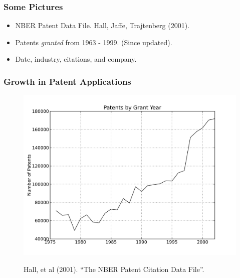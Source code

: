 \documentclass{beamer}
\begin{document}

\begin{frame}[t]\frametitle{Some Pictures}
    
\begin{itemize}
  \item NBER Patent Data File. Hall, Jaffe, Trajtenberg (2001).
  \item Patents \emph{granted} from 1963 - 1999. (Since updated).
  \item Date, industry, citations, and company.
\end{itemize}

\end{frame}

\begin{frame}[t]\frametitle{Growth in Patent Applications} 
\fontsize{6pt}{7.2}\selectfont
\!\!\!\!\!\!\!\!\!\!\!\!\!\!
\begin{figure}[hb]
  \begin{center}
      \includegraphics[scale=.5]{grant_year.png}
      \label{fig:grant_year}
  \end{center}
  \!\!\!\!\!
  Hall, et al (2001). ``The NBER Patent Citation Data File''.
\end{figure}
\end{frame}
\end{document}
